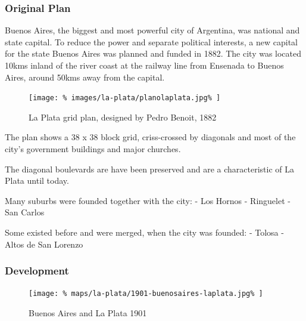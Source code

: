 \documentclass[twocolumn]{article}
\begin{document}
			
			\subsubsection{Original Plan}
			Buenos Aires, the biggest and most powerful city of Argentina, was national and state capital. To reduce the power and separate political interests, a new capital for the state Buenos Aires was planned and funded in 1882.
			The city was located 10kms inland of the river coast at the railway line from Ensenada to Buenos Aires, around 50kms away from the capital.
			
			\begin{figure}[h!]
				\texttt{[image: \%
					images/la-plata/planolaplata.jpg\%
				]}
				\caption{La Plata grid plan, designed by Pedro Benoit, 1882\cite{RecoletaCemetery:PedroBenoit}}
				\label{fig:img:plan-la-plata-1882}
			\end{figure}
			
			The plan shows a 38 x 38 block grid, criss-crossed by diagonals and most of the city’s government buildings and major churches.
			
			The diagonal boulevards are have been preserved and are a characteristic of La Plata until today.
			
			Many suburbs were founded together with the city:
			- Los Hornos
			- Ringuelet
			- San Carlos
			
			
			Some existed before and were merged, when the city was founded:
			- Tolosa
			- Altos de San Lorenzo
			
			
			
			\subsubsection{Development}
			
			
			\begin{figure}[h!]
				\texttt{[image: \%
					maps/la-plata/1901-buenosaires-laplata.jpg\%
				]}
				\caption{Buenos Aires and La Plata 1901\cite{RiviereDeLaPlata}}
				\label{fig:map:buenosaires-la-plata-1901}
			\end{figure}
			
			
			
\end{document}
